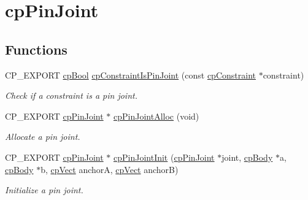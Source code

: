 \hypertarget{group__cpPinJoint}{}\section{cp\+Pin\+Joint}
\label{group__cpPinJoint}
\subsection*{Functions}
\begin{DoxyCompactItemize}
\item 
\mbox{\label{group__cpPinJoint_ga4f0d415dd1800c41496a9585a33eabe7}} 
C\+P\+\_\+\+E\+X\+P\+O\+RT \hyperlink{group__basicTypes_gabc5e752c48f3449ca26ef413ecbd647e}{cp\+Bool} \hyperlink{group__cpPinJoint_ga4f0d415dd1800c41496a9585a33eabe7}{cp\+Constraint\+Is\+Pin\+Joint} (const \hyperlink{structcpConstraint}{cp\+Constraint} $\ast$constraint)
\begin{DoxyCompactList}\small\item\em Check if a constraint is a pin joint. \end{DoxyCompactList}\item 
\mbox{\label{group__cpPinJoint_ga72bcc9055c83089ceeaa60ddf69b4543}} 
C\+P\+\_\+\+E\+X\+P\+O\+RT \hyperlink{structcpPinJoint}{cp\+Pin\+Joint} $\ast$ \hyperlink{group__cpPinJoint_ga72bcc9055c83089ceeaa60ddf69b4543}{cp\+Pin\+Joint\+Alloc} (void)
\begin{DoxyCompactList}\small\item\em Allocate a pin joint. \end{DoxyCompactList}\item 
\mbox{\label{group__cpPinJoint_ga1956122e22b3029648342c1b560c9fd3}} 
C\+P\+\_\+\+E\+X\+P\+O\+RT \hyperlink{structcpPinJoint}{cp\+Pin\+Joint} $\ast$ \hyperlink{group__cpPinJoint_ga1956122e22b3029648342c1b560c9fd3}{cp\+Pin\+Joint\+Init} (\hyperlink{structcpPinJoint}{cp\+Pin\+Joint} $\ast$joint, \hyperlink{structcpBody}{cp\+Body} $\ast$a, \hyperlink{structcpBody}{cp\+Body} $\ast$b, \hyperlink{structcpVect}{cp\+Vect} anchorA, \hyperlink{structcpVect}{cp\+Vect} anchorB)
\begin{DoxyCompactList}\small\item\em Initialize a pin joint. \end{DoxyCompactList}\item 
\mbox{\label{group__cpPinJoint_gae5aae573d6abec53660c4dfdb8e181c5}} 

\end{DoxyCompactItemize}
